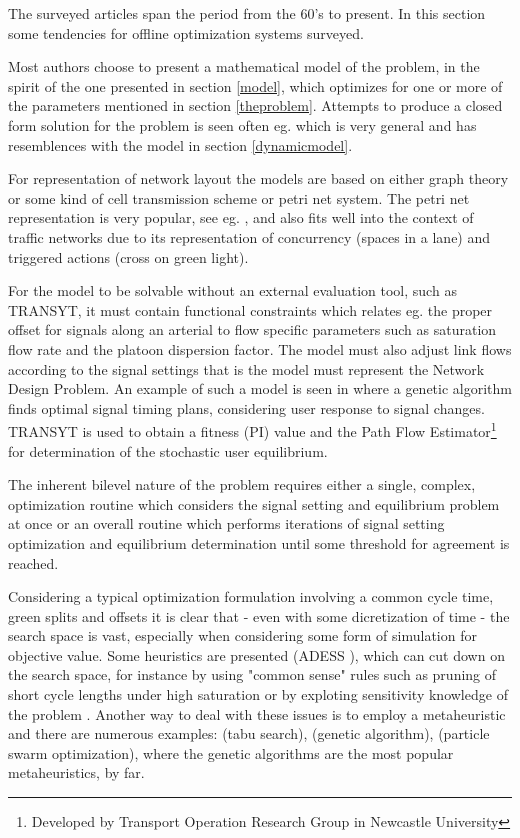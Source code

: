 The surveyed articles span the period from the 60's to present. In this section some tendencies for offline optimization systems surveyed.

Most authors choose to present a mathematical model of the problem, in the spirit of the one presented in section \ref{model}, which optimizes for one or more of the parameters mentioned in section \ref{theproblem}. Attempts to produce a closed form solution for the problem is seen often eg. \cite{36} which is very general and has resemblences with the model in section \ref{dynamicmodel}.

For representation of network layout the models are based on either graph theory or some kind of cell transmission scheme or petri net system. The petri net representation is very popular, see eg. \cite{petri}, and also fits well into the context of traffic networks due to its representation of concurrency (spaces in a lane) and triggered actions (cross on green light).

For the model to be solvable without an external evaluation tool, such as TRANSYT, it must contain functional constraints which relates eg. the proper offset for signals along an arterial to flow specific parameters such as saturation flow rate and the platoon dispersion factor.
The model must also adjust link flows according to the signal settings that is the model must represent the Network Design Problem. An example of such a model is seen in \cite{33} where a genetic algorithm finds optimal signal timing plans, considering user response to signal changes. TRANSYT is used to obtain a fitness (PI) value and the Path Flow Estimator\footnote{Developed by Transport Operation Research Group in Newcastle University} for determination of the stochastic user equilibrium.

The inherent bilevel nature of the problem requires either a single, complex, optimization routine which considers the signal setting and equilibrium problem at once or an overall routine which performs iterations of signal setting optimization and equilibrium determination until some threshold for agreement is reached. 

Considering a typical optimization formulation involving a common cycle time, green splits and offsets it is clear that - even with some dicretization of time - the search space is vast, especially when considering some form of simulation for objective value. Some heuristics are presented (ADESS \cite{26}), which can cut down on the search space, for instance by using "common sense" rules such as pruning of short cycle lengths under high saturation or by exploting sensitivity knowledge of the problem \cite{40}.
Another way to deal with these issues is to employ a metaheuristic and there are numerous examples: \cite{1} (tabu search), \cite{7} (genetic algorithm), \cite{42} (particle swarm optimization), where the genetic algorithms are the most popular metaheuristics, by far.

